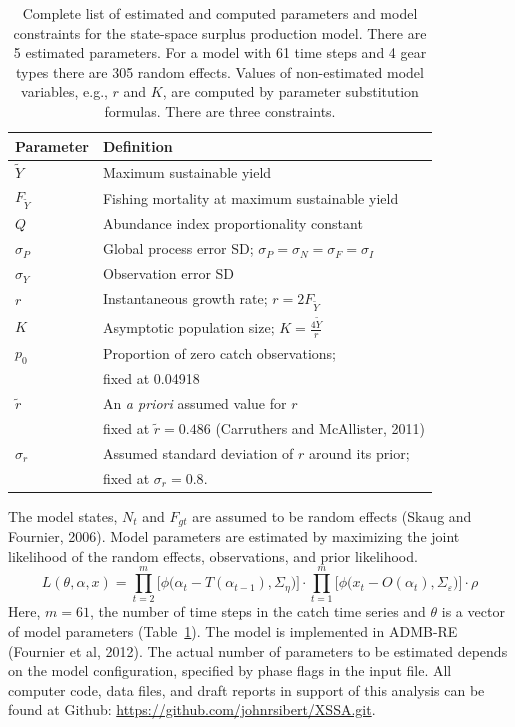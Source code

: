 \documentclass[12pt,letterpaper]{article}
\newcommand\MSY{\widetilde{Y}}
\newcommand\Fmsy{F_{\MSY}}
\begin{document}
\begin{table}
\caption{Complete list of estimated and computed parameters and model
constraints for 
the state-space surplus production model. There are 5 estimated parameters. 
For a model with 61 time steps and 4 gear types there are 305 random effects.
Values of non-estimated model variables, e.g.,  $r$ and $K$, are computed by
parameter substitution formulas.
There are three constraints.
}
\label{tab:allvars1}
\begin{center}
\begin{tabular}{ll}
\hline
Parameter & Definition\\
\hline
\hline
$\MSY$ & Maximum sustainable yield\\
$\Fmsy$& Fishing mortality at maximum sustainable yield\\
$Q$    & Abundance index proportionality constant\\
$\sigma_P$ & Global process error SD; $\sigma_P=\sigma_N=\sigma_F=\sigma_I$\\
$\sigma_Y$ & Observation error SD \\
\hline
$r$    & Instantaneous growth rate; $r=2F_{\MSY}$\\
$K$    & Asymptotic population size; $K=\frac{4\MSY}{r}$\\
\hline
$p_0$  & Proportion of zero catch observations;\\
       & fixed at 0.04918\\
$\tilde{r}$ & An {\it a priori} assumed value for $r$\\
            & fixed at $\tilde{r}=0.486$ (Carruthers and McAllister, 2011)\\
$\sigma_r$  & Assumed standard deviation of $r$ around its prior;\\
            & fixed at $\sigma_r=0.8$.\\
\hline
\end{tabular}
\end{center}
\end{table}



The model states, $N_t$ and $F_{gt}$ are assumed to be random
effects (Skaug and Fournier, 2006). Model parameters are estimated by
maximizing the joint likelihood of the random
effects, observations, and prior likelihood.
\begin{equation}
\label{eqn:likelihood}
L(\theta,\alpha,x)=
\prod^m_{t=2}\big[\phi\big(\alpha_t-T(\alpha_{t-1}), \Sigma_\eta\big)\big]\cdot
\prod^m_{t=1}\big[\phi\big(x_t-O(\alpha_t),
\Sigma_\varepsilon\big)\big]\cdot\rho
\end{equation}
Here, $m=61$, the number of time steps in the catch time series and
$\theta$ is a vector of model parameters (Table~\ref{tab:allvars1}).
The model is implemented in ADMB-RE (Fournier et al, 2012).
The actual number of
parameters to be estimated depends on the model configuration,
specified by phase flags in the input file. 
All computer code, data files, and draft reports in support of this
analysis can be found at Github:
\url{https://github.com/johnrsibert/XSSA.git}.
\end{document}

